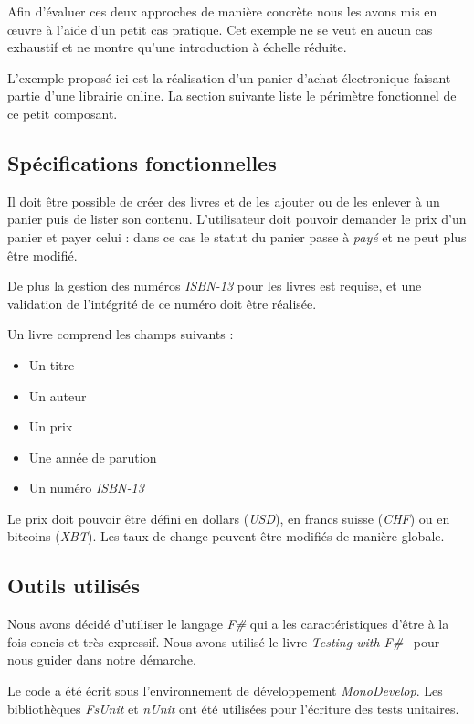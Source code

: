 \documentclass[journal, a4paper, frenchb]{IEEEtran}
\begin{document}
Afin d'évaluer ces deux approches de manière concrète nous les avons mis en œuvre à l'aide d'un petit cas pratique. Cet exemple ne se veut en aucun cas exhaustif et ne montre qu'une introduction à échelle réduite.

L'exemple proposé ici est la réalisation d'un panier d'achat électronique faisant partie d'une librairie online. La section suivante liste le périmètre fonctionnel de ce petit composant.

\subsection{Spécifications fonctionnelles}

Il doit être possible de créer des livres et de les ajouter ou de les enlever à un panier puis de lister son contenu. L'utilisateur doit pouvoir demander le prix d'un panier et payer celui : dans ce cas le statut du panier passe à \emph{payé} et ne peut plus être modifié.

De plus la gestion des numéros \emph{ISBN-13} pour les livres est requise, et une validation de l'intégrité de ce numéro doit être réalisée.

Un livre comprend les champs suivants :
\begin{itemize}
   \item Un titre
   \item Un auteur
   \item Un prix
   \item Une année de parution
   \item Un numéro \emph{ISBN-13}
\end{itemize}

Le prix doit pouvoir être défini en dollars (\emph{USD}), en francs suisse (\emph{CHF}) ou en bitcoins (\emph{XBT}). Les taux de change peuvent être modifiés de manière globale.


\subsection{Outils utilisés}

Nous avons décidé d'utiliser le langage \emph{F\#} qui a les caractéristiques d'être à la fois concis et très expressif. Nous avons utilisé le livre \emph{Testing with F\#}~\cite{TDDLundin} pour nous guider dans notre démarche.

Le code a été écrit sous l'environnement de développement \emph{MonoDevelop}. Les bibliothèques \emph{FsUnit} et \emph{nUnit} ont été utilisées pour l'écriture des tests unitaires.
\end{document}
